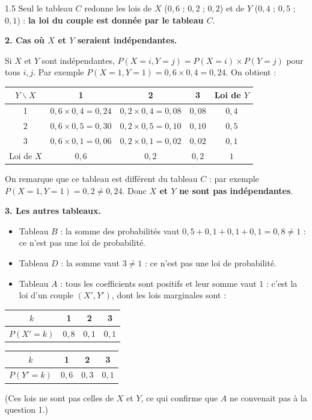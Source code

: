 \documentclass[12pt]{article}
\begin{document}
\begin{spacing}{1.5}
Seul le tableau $C$ redonne les lois de $X$ ($0{,}6$ ; $0{,}2$ ; $0{,}2$) et de $Y$ ($0{,}4$ ; $0{,}5$ ; $0{,}1$) : \textbf{la loi du couple est donnée par le tableau $C$}.

\textbf{2. Cas où $X$ et $Y$ seraient indépendantes.}

Si $X$ et $Y$ sont indépendantes, $P(X=i,Y=j)=P(X=i)\times P(Y=j)$ pour tous $i,j$. Par exemple $P(X=1,Y=1)=0{,}6\times0{,}4=0{,}24$. On obtient :

\begin{center}
\begin{tabular}{|c|c|c|c|c|}
\hline
$Y\backslash X$ & 1 & 2 & 3 & Loi de $Y$\\
\hline
1 & $0{,}6\times0{,}4=0{,}24$ & $0{,}2\times0{,}4=0{,}08$ & $0{,}08$ & $0{,}4$\\
\hline
2 & $0{,}6\times0{,}5=0{,}30$ & $0{,}2\times0{,}5=0{,}10$ & $0{,}10$ & $0{,}5$\\
\hline
3 & $0{,}6\times0{,}1=0{,}06$ & $0{,}2\times0{,}1=0{,}02$ & $0{,}02$ & $0{,}1$\\
\hline
Loi de $X$ & $0{,}6$ & $0{,}2$ & $0{,}2$ & $1$\\
\hline
\end{tabular}
\end{center}

On remarque que ce tableau est différent du tableau $C$ : par exemple $P(X=1,Y=1)=0{,}2\neq0{,}24$. Donc \textbf{$X$ et $Y$ ne sont pas indépendantes}.

\textbf{3. Les autres tableaux.}

\begin{itemize}
\item Tableau $B$ : la somme des probabilités vaut $0{,}5+0{,}1+0{,}1+0{,}1=0{,}8\neq1$ : ce n'est pas une loi de probabilité.
\item Tableau $D$ : la somme vaut $3\neq1$ : ce n'est pas une loi de probabilité.
\item Tableau $A$ : tous les coefficients sont positifs et leur somme vaut $1$ : c'est la loi d'un couple $(X',Y')$, dont les lois marginales sont :
\end{itemize}

\begin{center}
\begin{tabular}{|c|c|c|c|}
\hline
$k$ & 1 & 2 & 3 \\
\hline
$P(X'=k)$ & $0{,}8$ & $0{,}1$ & $0{,}1$ \\
\hline
\end{tabular}
\qquad
\begin{tabular}{|c|c|c|c|}
\hline
$k$ & 1 & 2 & 3 \\
\hline
$P(Y'=k)$ & $0{,}6$ & $0{,}3$ & $0{,}1$ \\
\hline
\end{tabular}
\end{center}
(Ces lois ne sont pas celles de $X$ et $Y$, ce qui confirme que $A$ ne convenait pas à la question 1.)


\end{spacing}
\end{document}
